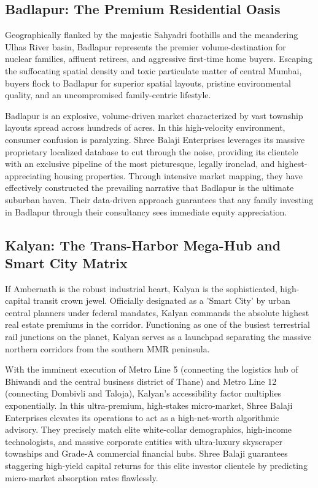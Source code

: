 \subsection{Badlapur: The Premium Residential Oasis}
Geographically flanked by the majestic Sahyadri foothills and the meandering Ulhas River basin, Badlapur represents the premier volume-destination for nuclear families, affluent retirees, and aggressive first-time home buyers. Escaping the suffocating spatial density and toxic particulate matter of central Mumbai, buyers flock to Badlapur for superior spatial layouts, pristine environmental quality, and an uncompromised family-centric lifestyle.

Badlapur is an explosive, volume-driven market characterized by vast township layouts spread across hundreds of acres. In this high-velocity environment, consumer confusion is paralyzing. Shree Balaji Enterprises leverages its massive proprietary localized database to cut through the noise, providing its clientele with an exclusive pipeline of the most picturesque, legally ironclad, and highest-appreciating housing properties. Through intensive market mapping, they have effectively constructed the prevailing narrative that Badlapur is the ultimate suburban haven. Their data-driven approach guarantees that any family investing in Badlapur through their consultancy sees immediate equity appreciation.

\subsection{Kalyan: The Trans-Harbor Mega-Hub and Smart City Matrix}
If Ambernath is the robust industrial heart, Kalyan is the sophisticated, high-capital transit crown jewel. Officially designated as a 'Smart City' by urban central planners under federal mandates, Kalyan commands the absolute highest real estate premiums in the corridor. Functioning as one of the busiest terrestrial rail junctions on the planet, Kalyan serves as a launchpad separating the massive northern corridors from the southern MMR peninsula.

With the imminent execution of Metro Line 5 (connecting the logistics hub of Bhiwandi and the central business district of Thane) and Metro Line 12 (connecting Dombivli and Taloja), Kalyan's accessibility factor multiplies exponentially. In this ultra-premium, high-stakes micro-market, Shree Balaji Enterprises elevates its operations to act as a high-net-worth algorithmic advisory. They precisely match elite white-collar demographics, high-income technologists, and massive corporate entities with ultra-luxury skyscraper townships and Grade-A commercial financial hubs. Shree Balaji guarantees staggering high-yield capital returns for this elite investor clientele by predicting micro-market absorption rates flawlessly.

